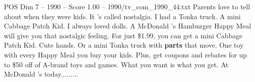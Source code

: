 \begin{textsample}{POS Dim 7 – 1990 – Score 1.00 – 1990/tv\_com\_1990\_44.txt}  \label{ex:f7_pos_067}
Parents love to tell about when they were kids.
It 's called nostalgia.
I had a Tonka truck.
A mini Cabbage Patch Kid.
I always loved dolls.
A McDonald 's Hamburger Happy Meal will give you that nostalgic feeling.
For just \$1.99, you can get a mini Cabbage Patch Kid.
Cute hands.
Or a mini Tonka truck with \textbf{parts} that move.
One toy with every Happy Meal you buy your kids.
Plus, get coupons and rebates for up to \$50 off of A-brand toys and games.
What you want is what you get.
At McDonald 's today.........

\end{textsample}
